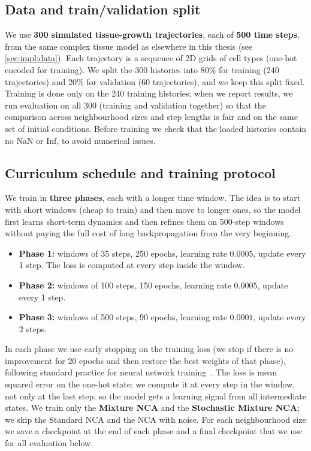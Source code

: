 \subsection{Data and train/validation split}
\label{sec:impl:curriculum:data}

We use \textbf{300 simulated tissue-growth trajectories}, each of \textbf{500 time steps}, from the same complex tissue model as elsewhere in this thesis (see \cref{sec:impl:data}).
Each trajectory is a sequence of 2D grids of cell types (one-hot encoded for training).
We split the 300 histories into 80\% for training (240 trajectories) and 20\% for validation (60 trajectories), and we keep this split fixed.
Training is done only on the 240 training histories; when we report results, we run evaluation on all 300 (training and validation together) so that the comparison across neighbourhood sizes and step lengths is fair and on the same set of initial conditions.
Before training we check that the loaded histories contain no NaN or Inf, to avoid numerical issues.

\subsection{Curriculum schedule and training protocol}
\label{sec:impl:curriculum:schedule}

We train in \textbf{three phases}, each with a longer time window.
The idea is to start with short windows (cheap to train) and then move to longer ones, so the model first learns short-term dynamics and then refines them on 500-step windows without paying the full cost of long backpropagation from the very beginning.

\begin{itemize}
\item \textbf{Phase 1:} windows of 35 steps, 250 epochs, learning rate \(0.0005\), update every 1 step. The loss is computed at every step inside the window.
\item \textbf{Phase 2:} windows of 100 steps, 150 epochs, learning rate \(0.0005\), update every 1 step.
\item \textbf{Phase 3:} windows of 500 steps, 90 epochs, learning rate \(0.0001\), update every 2 steps.
\end{itemize}

In each phase we use early stopping on the training loss (we stop if there is no improvement for 20 epochs and then restore the best weights of that phase), following standard practice for neural network training~\cite{prechelt1998early}.
The loss is mean squared error on the one-hot state; we compute it at every step in the window, not only at the last step, so the model gets a learning signal from all intermediate states.
We train only the \textbf{Mixture NCA} and the \textbf{Stochastic Mixture NCA}; we skip the Standard NCA and the NCA with noise.
For each neighbourhood size we save a checkpoint at the end of each phase and a final checkpoint that we use for all evaluation below.

